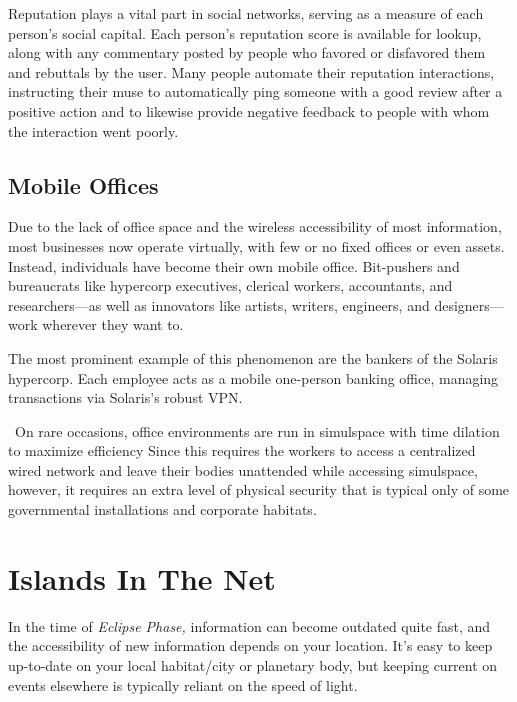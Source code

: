 Reputation plays a vital part in social networks, 
serving as a measure of each person's social capital. 
Each person's reputation score is available for lookup, 
along with any commentary posted by people who 
favored or disfavored them and rebuttals by the user. 
Many people automate their reputation interactions, 
instructing their muse to automatically ping someone
with a good review after a positive action and
to likewise provide negative feedback to people with 
whom the interaction went poorly.

\subsection{Mobile Offices}

Due to the lack of office space and the wireless accessibility
of most information, most businesses
now operate virtually, with few or no fixed offices 
or even assets. Instead, individuals have become their 
own mobile office. Bit-pushers and bureaucrats like 
hypercorp executives, clerical workers, accountants, 
and researchers—as well as innovators like artists, 
writers, engineers, and designers—work wherever 
they want to.

The most prominent example of this phenomenon 
are the bankers of the Solaris hypercorp. Each employee
acts as a mobile one-person banking office,
managing transactions via Solaris's robust VPN.

 On rare occasions, office environments are run 
in simulspace with time dilation to maximize efficiency
Since this requires the workers to access a
centralized wired network and leave their bodies 
unattended while accessing simulspace, however, it 
requires an extra level of physical security that is 
typical only of some governmental installations and 
corporate habitats.

\section{Islands In The Net}

In the time of \textit{Eclipse Phase,} information can become 
outdated quite fast, and the accessibility of new information
depends on your location. It's easy to keep up-to-date
on your local habitat/city or planetary body,
but keeping current on events elsewhere is typically 
reliant on the speed of light.

